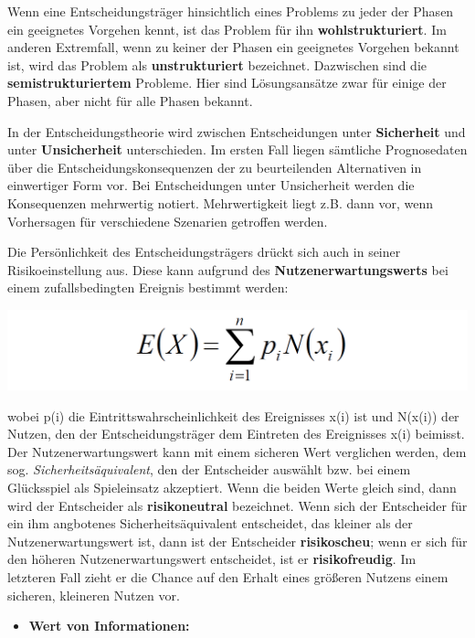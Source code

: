 \documentclass[]{article}
\providecommand{\tightlist}{%
  \setlength{\itemsep}{0pt}\setlength{\parskip}{0pt}}
\begin{document}
Wenn eine Entscheidungsträger hinsichtlich eines Problems zu jeder der
Phasen ein geeignetes Vorgehen kennt, ist das Problem für ihn
\textbf{wohlstrukturiert}. Im anderen Extremfall, wenn zu keiner der
Phasen ein geeignetes Vorgehen bekannt ist, wird das Problem als
\textbf{unstrukturiert} bezeichnet. Dazwischen sind die
\textbf{semistrukturiertem} Probleme. Hier sind Lösungsansätze zwar für
einige der Phasen, aber nicht für alle Phasen bekannt.

In der Entscheidungstheorie wird zwischen Entscheidungen unter
\textbf{Sicherheit} und unter \textbf{Unsicherheit} unterschieden. Im
ersten Fall liegen sämtliche Prognosedaten über die
Entscheidungskonsequenzen der zu beurteilenden Alternativen in
einwertiger Form vor. Bei Entscheidungen unter Unsicherheit werden die
Konsequenzen mehrwertig notiert. Mehrwertigkeit liegt z.B. dann vor,
wenn Vorhersagen für verschiedene Szenarien getroffen werden.

Die Persönlichkeit des Entscheidungsträgers drückt sich auch in seiner
Risikoeinstellung aus. Diese kann aufgrund des
\textbf{Nutzenerwartungswerts} bei einem zufallsbedingten Ereignis
bestimmt werden:

\includegraphics{img/nutzerwert.png}

wobei p(i) die Eintrittswahrscheinlichkeit des Ereignisses x(i) ist und
N(x(i)) der Nutzen, den der Entscheidungsträger dem Eintreten des
Ereignisses x(i) beimisst. Der Nutzenerwartungswert kann mit einem
sicheren Wert verglichen werden, dem sog. \emph{Sicherheitsäquivalent},
den der Entscheider auswählt bzw. bei einem Glücksspiel als Spieleinsatz
akzeptiert. Wenn die beiden Werte gleich sind, dann wird der Entscheider
als \textbf{risikoneutral} bezeichnet. Wenn sich der Entscheider für ein
ihm angbotenes Sicherheitsäquivalent entscheidet, das kleiner als der
Nutzenerwartungswert ist, dann ist der Entscheider \textbf{risikoscheu};
wenn er sich für den höheren Nutzenerwartungswert entscheidet, ist er
\textbf{risikofreudig}. Im letzteren Fall zieht er die Chance auf den
Erhalt eines größeren Nutzens einem sicheren, kleineren Nutzen vor.

\begin{itemize}
\tightlist
\item
  \textbf{Wert von Informationen:}
\end{itemize}
\end{document}
